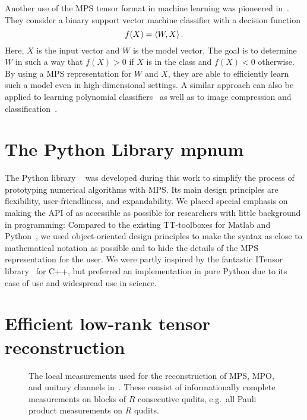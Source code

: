 Another use of the MPS tensor format in machine learning was pioneered in~\cite{Stoudenmire_2016_Supervised}.
They consider a binary support vector machine classifier with a decision function
\[
  f(X) = \braket{W, X}.
\]
Here, $X$ is the input vector and $W$ is the model vector.
The goal is to determine $W$ in such a way that $f(X) > 0$ if $X$ is in the  class and $f(X) < 0$ otherwise.
By using a MPS representation for $W$ and $X$, they are able to efficiently learn such a model even in high-dimensional settings.
A similar approach can also be applied to learning polynomial classifiers~\cite{Chen_2017_Parallelized} as well as to image compression and classification~\cite{Bengua_2015_Optimal,Bengua_2016_Matrix}.



\section{The Python Library mpnum}%
\label{sec:tensors.mpnum}

The Python library \mpnum~\cite{Suess_2017_Mpnum} was developed during this work to simplify the process of prototyping numerical algorithms with MPS.
Its main design principles are flexibility, user-friendliness, and expandability.
We placed special emphasis on making the API of \mpnum as accessible as possible for researchers with little background in programming:
Compared to the existing TT-toolboxes for Matlab and Python~\cite{Oseledets_2018_Git,Oseledets_2018_Ttpy}, we used object-oriented design principles to make the syntax as close to mathematical notation as possible and to hide the details of the MPS representation for the user.
We were partly inspired by the fantastic ITensor library~\cite{Stoudenmire_2018_Itensor} for C++, but preferred an implementation in pure Python due to its ease of use and widespread use in science.





\section{Efficient low-rank tensor reconstruction}%
\label{sec:tensors.als}

\begin{figure*}
  \centering
  
  \caption{%
    The local measurements used for the reconstruction of MPS, MPO, and unitary channels in~\cite{Cramer_2010_Efficient,Baumgratz_2013_Scalable,Baumgratz_2013_Scalablea,Lanyon_2017_Efficient,Holzaepfel_2014_Scalable}.
    These consist of informationally complete measurements on blocks of $R$ consecutive qudits, e.g.\ all Pauli product measurements on $R$ qudits.
    }%
  \label{fig:als.quantum_measurements}
\end{figure*}


